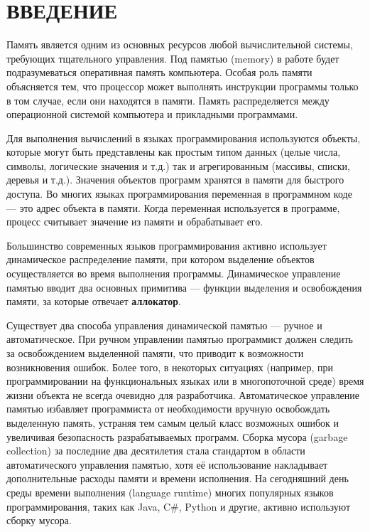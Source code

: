 \part*{ВВЕДЕНИЕ}

Память является одним из основных ресурсов любой вычислительной системы, требующих тщательного управления. Под памятью (memory) в работе будет подразумеваться оперативная память компьютера. Особая роль памяти объясняется тем, что процессор может выполнять инструкции программы только в том случае, если они находятся в памяти. Память распределяется между операционной системой компьютера и прикладными программами. \cite{tannenbaum}

Для выполнения вычислений в языках программирования используются объекты, которые могут быть представлены как простым типом данных (целые числа, символы, логические значения и т.д.) так и агрегированным (массивы, списки, деревья и т.д.). Значения объектов программ хранятся в памяти для быстрого доступа. Во многих языках программирования переменная в программном коде --- это адрес объекта в памяти. \cite{c} \cite{cpp} \cite{golang} Когда переменная используется в программе, процесс считывает значение из памяти и обрабатывает его.

Большинство современных языков программирования активно использует динамическое распределение памяти, при котором выделение объектов осуществляется во время выполнения программы. Динамическое управление памятью вводит два основных примитива --- функции выделения и освобождения памяти, за которые отвечает \textbf{аллокатор}. 

Существует два способа управления динамической памятью --- ручное и автоматическое. При ручном управлении памятью программист должен следить за освобождением выделенной памяти, что приводит к возможности возникновения ошибок. Более того, в некоторых ситуациях (например, при программировании на функциональных языках или в многопоточной среде) время жизни объекта не всегда очевидно для разработчика. \cite{elixir} Автоматическое управление памятью избавляет программиста от необходимости вручную освобождать выделенную память, устраняя тем самым целый класс возможных ошибок и увеличивая безопасность разрабатываемых программ. Сборка мусора (garbage collection) за последние два десятилетия стала стандартом в области автоматического управления памятью, хотя её использование накладывает дополнительные расходы памяти и времени исполнения. На сегодняшний день среды времени выполнения (language runtime) многих популярных языков программирования, таких как Java, C\#, Python и другие, активно используют сборку мусора. 

